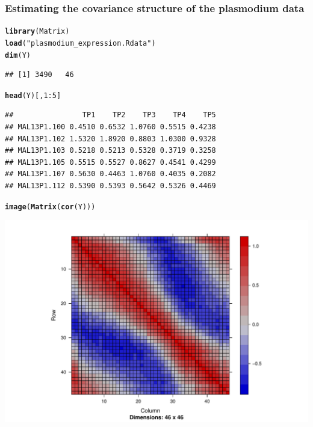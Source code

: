 \documentclass{beamer}\usepackage[]{graphicx}\usepackage[]{color}
\makeatletter
\newcommand{\hlnum}[1]{\textcolor[rgb]{0.686,0.059,0.569}{#1}}%
\newcommand{\hlstr}[1]{\textcolor[rgb]{0.192,0.494,0.8}{#1}}%
\newcommand{\hlopt}[1]{\textcolor[rgb]{0,0,0}{#1}}%
\newcommand{\hlstd}[1]{\textcolor[rgb]{0.345,0.345,0.345}{#1}}%
\newcommand{\hlkwd}[1]{\textcolor[rgb]{0.737,0.353,0.396}{\textbf{#1}}}%
\newenvironment{kframe}{%
 \def\at@end@of@kframe{}%
 \ifinner\ifhmode%
  \def\at@end@of@kframe{\end{minipage}}%
  \begin{minipage}{\columnwidth}%
 \fi\fi%
 \def\FrameCommand##1{\hskip\@totalleftmargin \hskip-\fboxsep
 \colorbox{shadecolor}{##1}\hskip-\fboxsep
     \hskip-\linewidth \hskip-\@totalleftmargin \hskip\columnwidth}%
 \MakeFramed {\advance\hsize-\width
   \@totalleftmargin\z@ \linewidth\hsize
   \@setminipage}}%
 {\par\unskip\endMakeFramed%
 \at@end@of@kframe}
\newenvironment{knitrout}{}{} %
\makeatother
\begin{document}
\begin{frame}
\frametitle{Estimating the covariance structure of the plasmodium data}

\begin{knitrout}\scriptsize
{}\color{fgcolor}\begin{kframe}
\begin{alltt}
\hlkwd{library}\hlstd{(Matrix)}
\hlkwd{load}\hlstd{(}\hlstr{"plasmodium_expression.Rdata"}\hlstd{)}
\hlkwd{dim}\hlstd{(Y)}
\end{alltt}
\begin{verbatim}
## [1] 3490   46
\end{verbatim}
\begin{alltt}
\hlkwd{head}\hlstd{(Y)[,} \hlnum{1}\hlopt{:}\hlnum{5}\hlstd{]}
\end{alltt}
\begin{verbatim}
##                TP1    TP2    TP3    TP4    TP5
## MAL13P1.100 0.4510 0.6532 1.0760 0.5515 0.4238
## MAL13P1.102 1.5320 1.8920 0.8803 1.0300 0.9328
## MAL13P1.103 0.5218 0.5213 0.5328 0.3719 0.3258
## MAL13P1.105 0.5515 0.5527 0.8627 0.4541 0.4299
## MAL13P1.107 0.5630 0.4463 1.0760 0.4035 0.2082
## MAL13P1.112 0.5390 0.5393 0.5642 0.5326 0.4469
\end{verbatim}
\begin{alltt}
\hlkwd{image}\hlstd{(}\hlkwd{Matrix}\hlstd{(}\hlkwd{cor}\hlstd{(Y)))}
\end{alltt}
\end{kframe}
\includegraphics[width=\textwidth]{figures/ggm-unnamed-chunk-86-1} 

\end{knitrout}
\end{frame}
\end{document}
